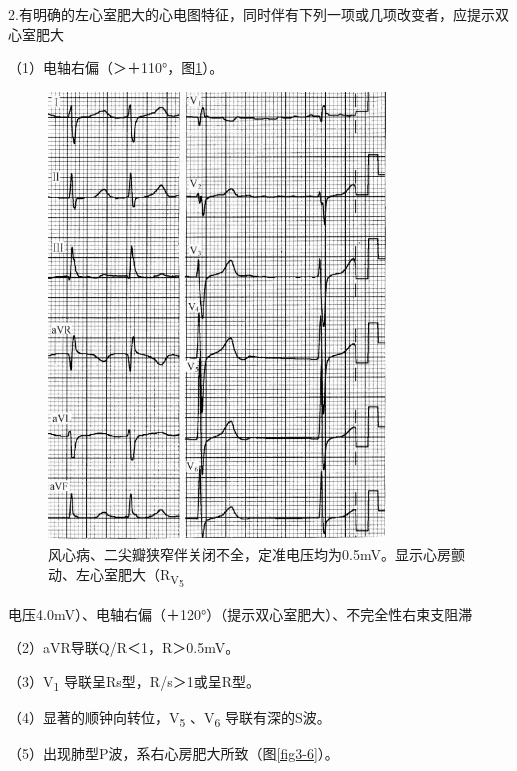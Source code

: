2.有明确的左心室肥大的心电图特征，同时伴有下列一项或几项改变者，应提示双心室肥大

（1）电轴右偏（＞＋110°，图\ref{fig3-5}）。

\begin{figure}[!htbp]
 \centering
 \includegraphics[width=3.52083in,height=4.67708in]{./images/Image00054.jpg}
 \captionsetup{justification=centering}
 \caption{风心病、二尖瓣狭窄伴关闭不全，定准电压均为0.5mV。显示心房颤动、左心室肥大（R\textsubscript{V\textsubscript{5}}}
 \label{fig3-5}
  \end{figure} 
电压4.0mV）、电轴右偏（＋120°）（提示双心室肥大）、不完全性右束支阻滞

（2）aVR导联Q/R＜1，R＞0.5mV。

（3）V\textsubscript{1} 导联呈Rs型，R/s＞1或呈R型。

（4）显著的顺钟向转位，V\textsubscript{5} 、V\textsubscript{6}
导联有深的S波。

（5）出现肺型P波，系右心房肥大所致（图\ref{fig3-6}）。

